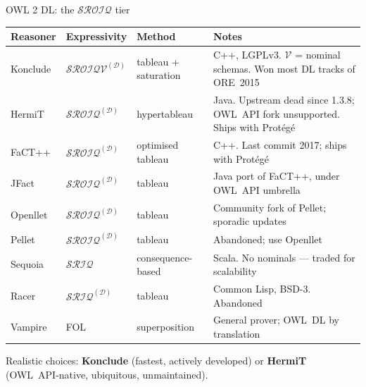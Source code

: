 \documentclass[10pt,aspectratio=169,xcolor=table]{beamer}
\newcommand{\dl}[1]{\ensuremath{\mathcal{#1}}}
\newcommand{\SROIQ}{\dl{SROIQ}}
\newcommand{\hl}[1]{\textcolor{accent}{\textbf{#1}}}
\begin{document}
\begin{frame}{OWL 2 DL: the $\SROIQ$ tier}
  \centering\scriptsize
  \begin{tabular}{@{}lllp{7.2cm}@{}}
    \toprule
    \textbf{Reasoner} & \textbf{Expressivity} & \textbf{Method} & \textbf{Notes}\\
    \midrule
    \rowcolor{accent!12}
    Konclude & $\SROIQ\mathcal{V}^{(\mathcal{D})}$ & tableau + saturation
      & C++, LGPLv3. $\mathcal{V}$ = nominal schemas. Won most DL tracks of ORE~2015\\
    \rowcolor{accent!12}
    HermiT & $\SROIQ^{(\mathcal{D})}$ & hypertableau
      & Java. Upstream dead since 1.3.8; OWL~API fork unsupported. Ships with Prot\'eg\'e\\
    FaCT++ & $\SROIQ^{(\mathcal{D})}$ & optimised tableau & C++. Last commit 2017; ships with Prot\'eg\'e\\
    JFact & $\SROIQ^{(\mathcal{D})}$ & tableau & Java port of FaCT++, under OWL~API umbrella\\
    Openllet & $\SROIQ^{(\mathcal{D})}$ & tableau & Community fork of Pellet; sporadic updates\\
    Pellet & $\SROIQ^{(\mathcal{D})}$ & tableau & Abandoned; use Openllet\\
    Sequoia & $\dl{SRIQ}$ & consequence-based & Scala. No nominals --- traded for scalability\\
    Racer & $\dl{SRIQ}^{(\mathcal{D})}$ & tableau & Common Lisp, BSD-3. Abandoned\\
    Vampire & FOL & superposition & General prover; OWL~DL by translation\\
    \bottomrule
  \end{tabular}
  \vspace{0.6em}

  \raggedright\small
  Realistic choices: \hl{Konclude} (fastest, actively developed) or \hl{HermiT}
  (OWL~API-native, ubiquitous, unmaintained).
\end{frame}
\end{document}
